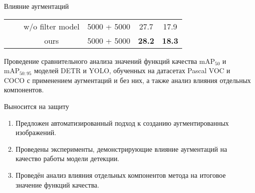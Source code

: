 \documentclass{beamer}
\begin{document}
\begin{frame}{Влияние аугментаций}
\begin{table}[p]
\begin{tabular}{cccc|cc}
        &                              & w/o filter model             & 5000 + 5000 & 27.7 & 17.9 \\
        &                              & ours                          & 5000 + 5000 & \textbf{28.2} & \textbf{18.3} \\
\bottomrule
\end{tabular}
\end{table}
\small{
Проведение сравнительного анализа значений функций качества $\mathrm{mAP}_{50}$ и $\mathrm{mAP}_{50:95}$ моделей DETR и YOLO, обученных на датасетах Pascal VOC и COCO с применением аугментаций и без них, а также анализ влияния отдельных компонентов.
}


\end{frame}
\begin{frame}{Выносится на защиту}

{\begin{enumerate}
\Large
    \item Предложен автоматизированный подход к созданию аугментированных изображений.
    \item Проведены эксперименты, демонстрирующие влияние аугментаций на качество работы модели детекции.
    \item Проведён анализ влияния отдельных компонентов метода на итоговое значение функций качества.
\end{enumerate}}


\end{frame}
\end{document}
